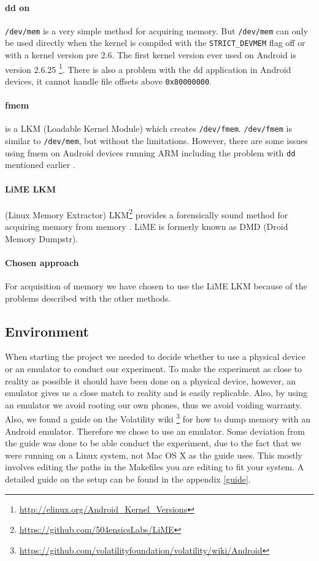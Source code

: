 \paragraph{dd on} \texttt{/dev/mem} is a very simple method for acquiring memory. But \texttt{/dev/mem} 
can only be used directly when the kernel is compiled with the \texttt{STRICT\_DEVMEM} flag off or with 
a kernel version pre 2.6. The first kernel version ever used on Android is version 2.6.25
\footnote{\url{http://elinux.org/Android\_Kernel\_Versions}}. There is also a problem with the dd 
application in Android devices, it cannot handle file offsets above \texttt{0x80000000}\cite{acq_vol_android_mem}.
\paragraph{fmem} is a LKM (Loadable Kernel Module) which creates \texttt{/dev/fmem}. \texttt{/dev/fmem} 
is similar to \texttt{/dev/mem}, but without the limitations. However, there are some issues using 
fmem on Android devices running ARM including the problem with \texttt{dd} mentioned earlier \cite{acq_vol_android_mem}.
\paragraph{LiME LKM} (Linux Memory Extractor) LKM\footnote{\url{https://github.com/504ensicsLabs/LiME}} 
provides a forensically sound method for acquiring memory from memory \cite{heriyanto2013procedures}. 
LiME is formerly known as DMD (Droid Memory Dumpstr).
\paragraph{Chosen approach} For acquisition of memory we have chosen to use the LiME LKM because of 
the problems described with the other methods.
\subsection{Environment}
When starting the project we needed to decide whether to use a physical device 
or an emulator to conduct our experiment. To make the experiment as close to 
reality as possible it should have been done on a physical device, however, an 
emulator gives us a close match to reality and is easily replicable. Also, by 
using an emulator we avoid rooting our own phones, thus we avoid voiding 
warranty. Also, we found a guide on the Volatility wiki
\footnote{\url{https://github.com/volatilityfoundation/volatility/wiki/Android}} 
for how to dump memory with an Android emulator. Therefore we chose to use an 
emulator. Some deviation from the guide was done to be able conduct the 
experiment, due to the fact that we were running on a Linux system, not Mac OS 
X as the guide uses. This mostly involves editing the paths in the Makefiles 
you are editing to fit your system. %
A detailed guide on the setup can be found in the appendix \ref{guide}.\\

